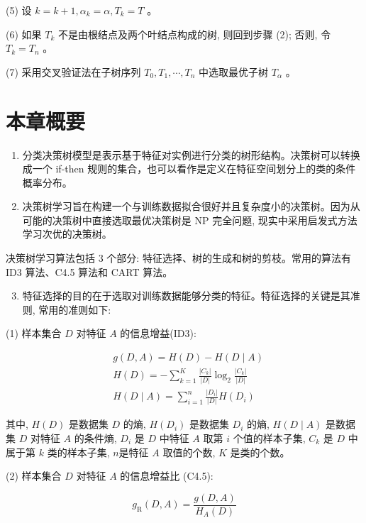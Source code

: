 \documentclass[10pt]{article}
\begin{document}
\begin{CJK*}{UTF8}{bsmi}
(5) 设 $k=k+1, \alpha_{k}=\alpha, T_{k}=T$ 。

(6) 如果 $T_{k}$ 不是由根结点及两个叶结点构成的树, 则回到步骤 (2); 否则, 令 $T_{k}=T_{n}$ 。

(7) 采用交叉验证法在子树序列 $T_{0}, T_{1}, \cdots, T_{n}$ 中选取最优子树 $T_{\alpha}$ 。

\section*{本章概要}
\begin{enumerate}
  \item 分类决策树模型是表示基于特征对实例进行分类的树形结构。决策树可以转换成一个 if-then 规则的集合，也可以看作是定义在特征空间划分上的类的条件概率分布。

  \item 决策树学习旨在构建一个与训练数据拟合很好并且复杂度小的决策树。因为从可能的决策树中直接选取最优决策树是 NP 完全问题, 现实中采用启发式方法学习次优的决策树。

\end{enumerate}

决策树学习算法包括 3 个部分: 特征选择、树的生成和树的剪枝。常用的算法有 ID3 算法、C4.5 算法和 CART 算法。

\begin{enumerate}
  \setcounter{enumi}{2}
  \item 特征选择的目的在于选取对训练数据能够分类的特征。特征选择的关键是其准则, 常用的准则如下:
\end{enumerate}

(1) 样本集合 $D$ 对特征 $A$ 的信息增益(ID3):

$$
\begin{aligned}
& g(D, A)=H(D)-H(D \mid A) \\
& H(D)=-\sum_{k=1}^{K} \frac{\left|C_{k}\right|}{|D|} \log _{2} \frac{\left|C_{k}\right|}{|D|} \\
& H(D \mid A)=\sum_{i=1}^{n} \frac{\left|D_{i}\right|}{|D|} H\left(D_{i}\right)
\end{aligned}
$$

其中, $H(D)$ 是数据集 $D$ 的熵, $H\left(D_{i}\right)$ 是数据集 $D_{i}$ 的熵, $H(D \mid A)$ 是数据集 $D$ 对特征 $A$ 的条件熵, $D_{i}$ 是 $D$ 中特征 $A$ 取第 $i$ 个值的样本子集, $C_{k}$ 是 $D$ 中属于第 $k$ 类的样本子集, $n$是特征 $A$ 取值的个数, $K$ 是类的个数。

(2) 样本集合 $D$ 对特征 $A$ 的信息增益比 (C4.5):

$$
g_{\mathrm{R}}(D, A)=\frac{g(D, A)}{H_{A}(D)}
$$


\end{CJK*}
\end{document}

